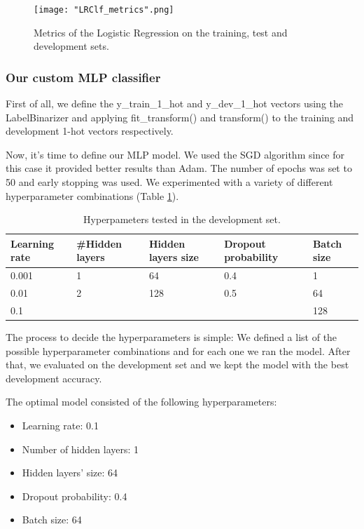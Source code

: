 \documentclass[10pt, a4paper]{article}
\begin{document}
	\begin{figure}
		\centering
		\texttt{[image: "LRClf\_metrics".png]}
		\caption{Metrics of the Logistic Regression on the training, test and development sets.}
		\label{fig::LR_metrics}
	\end{figure}
	
	
	\subsubsection{Our custom MLP classifier}
	
	First of all, we define the y\_train\_1\_hot and y\_dev\_1\_hot vectors using the LabelBinarizer and applying fit\_transform() and transform() to the training and development 1-hot vectors respectively.
	
	Now, it’s time to define our MLP model. We used the SGD algorithm since for this case it provided better results than Adam. The number of epochs was set to 50 and early stopping was used. We experimented with a variety of different hyperparameter combinations (Table \ref{tab::ex-9-hyper}).
	
	
	
	
	\begin{table}
		\centering
		\begin{tabular}{|l|l|l|l|l|}
			\hline
			\rowcolor{blue!25}\textbf{Learning rate} & \cellcolor{blue!25}\textbf{\#Hidden layers} & \cellcolor{blue!25}\textbf{Hidden layers size} & \cellcolor{blue!25}\textbf{Dropout probability} & \cellcolor{blue!25}\textbf{Batch size}\\
			\hline
			0.001 & 1 & 64 & 0.4 & 1\\
			\hline
			0.01 & 2 & 128 & 0.5 & 64\\
			\hline
			0.1 &  &  & & 128 \\
			
			
			
			\hline
		\end{tabular}
		\caption{Hyperpameters tested in the development set.}
		\label{tab::ex-9-hyper}
	\end{table}
	
	The process to decide the hyperparameters is simple: We defined a list of the possible hyperparameter combinations and for each one we ran the model. After that, we evaluated on the development set and we kept the model with the best development accuracy.
	
	
	The optimal model consisted of the following hyperparameters:
	\begin{itemize}
		\item Learning rate: 0.1
		\item Number of hidden layers: 1
		\item Hidden layers' size: 64
		\item Dropout probability: 0.4
		\item Batch size: 64
	\end{itemize}
	
\end{document}
